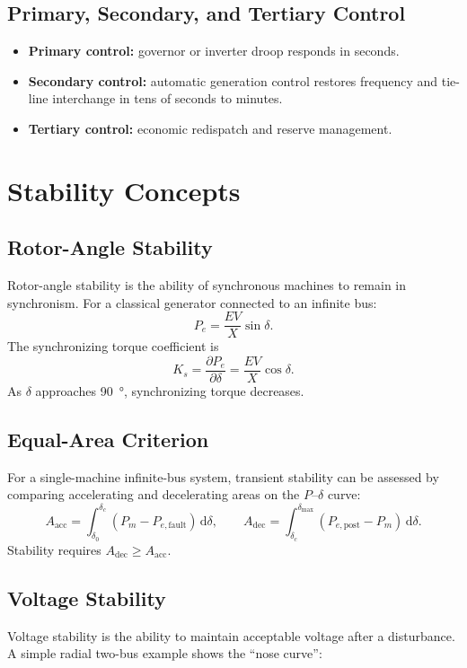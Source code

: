 \documentclass[11pt]{article}
\newcommand{\dd}{\mathrm{d}}
\begin{document}
\subsection{Primary, Secondary, and Tertiary Control}
\begin{itemize}
  \item \textbf{Primary control:} governor or inverter droop responds in seconds.
  \item \textbf{Secondary control:} automatic generation control restores
  frequency and tie-line interchange in tens of seconds to minutes.
  \item \textbf{Tertiary control:} economic redispatch and reserve management.
\end{itemize}

\section{Stability Concepts}

\subsection{Rotor-Angle Stability}
Rotor-angle stability is the ability of synchronous machines to remain in
synchronism. For a classical generator connected to an infinite bus:
\begin{equation}
P_e=\frac{EV}{X}\sin\delta.
\end{equation}
The synchronizing torque coefficient is
\begin{equation}
K_s=\frac{\partial P_e}{\partial \delta}=\frac{EV}{X}\cos\delta.
\end{equation}
As $\delta$ approaches \SI{90}{\degree}, synchronizing torque decreases.

\subsection{Equal-Area Criterion}
For a single-machine infinite-bus system, transient stability can be assessed by
comparing accelerating and decelerating areas on the $P$--$\delta$ curve:
\begin{equation}
A_{\mathrm{acc}}=\int_{\delta_0}^{\delta_c}(P_m-P_{e,\mathrm{fault}})\,\dd\delta,
\qquad
A_{\mathrm{dec}}=\int_{\delta_c}^{\delta_{\max}}(P_{e,\mathrm{post}}-P_m)\,\dd\delta.
\end{equation}
Stability requires $A_{\mathrm{dec}}\ge A_{\mathrm{acc}}$.

\subsection{Voltage Stability}
Voltage stability is the ability to maintain acceptable voltage after a
disturbance. A simple radial two-bus example shows the ``nose curve'':
\end{document}
